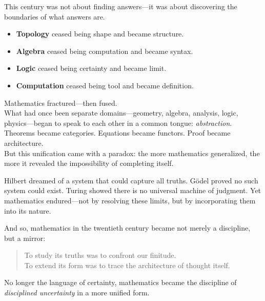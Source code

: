 \documentclass[9pt]{article}
\begin{document}
This century was not about finding answers---it was about discovering the boundaries of what answers are.\\

\begin{itemize}
  \item \textbf{Topology} ceased being shape and became structure.
  \item \textbf{Algebra} ceased being computation and became syntax.
  \item \textbf{Logic} ceased being certainty and became limit.
  \item \textbf{Computation} ceased being tool and became definition.
\end{itemize}

Mathematics fractured---then fused.\\

\noindent
What had once been separate domains---geometry, algebra, analysis, logic, physics---began to speak to each other in a common tongue: \textit{abstraction}. Theorems became categories. Equations became functors. Proof became architecture.\\

\noindent
But this unification came with a paradox: the more mathematics generalized, the more it revealed the impossibility of completing itself.

\bigskip

Hilbert dreamed of a system that could capture all truths. Gödel proved no such system could exist. Turing showed there is no universal machine of judgment. Yet mathematics endured---not by resolving these limits, but by incorporating them into its nature.

\bigskip

And so, mathematics in the twentieth century became not merely a discipline, but a mirror:

\begin{quote}
To study its truths was to confront our finitude. \\
To extend its form was to trace the architecture of thought itself.
\end{quote}

No longer the language of certainty, mathematics became the discipline of \textit{disciplined uncertainty} in a more unified form.
\end{document}
